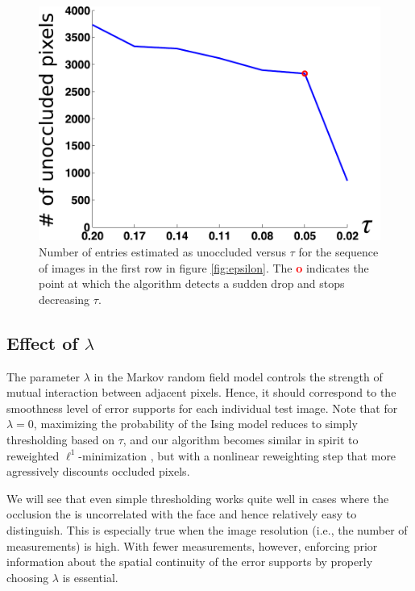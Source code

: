 \begin{figure}
\centering
\includegraphics[scale=0.6,clip=true]{figures_iccv/n_of_goodentry.pdf}\vspace{2mm}
\caption{Number of entries estimated as unoccluded versus
$\tau$ for the sequence of images in the first row in figure \ref{fig:epsilon}. The {\bf \textcolor{red} o} indicates the
point at which the algorithm detects a sudden drop and stops
decreasing $\tau$.} \label{fig:n_goodentry} \vspace{0mm}
\end{figure}

\subsection{Effect of $\lambda$}

The parameter $\lambda$ in the Markov random field model controls
the strength of mutual interaction between adjacent pixels. Hence, it
should correspond to the smoothness level of error supports for
each individual test image. Note that for $\lambda=0$, maximizing
the probability of the Ising model reduces to simply thresholding
based on $\tau$, and our algorithm becomes similar in spirit to
reweighted $\ell^1$-minimization \cite{Candes2008-JFAA}, but
with a nonlinear reweighting step that more agressively discounts occluded pixels.

We will see that even simple thresholding works
quite well in cases where the occlusion the is uncorrelated with the face and
hence relatively easy to distinguish. This is especially true when the
image resolution (i.e., the number of measurements) is high.
With fewer measurements, however, enforcing prior
information about the spatial continuity of the error supports by
properly choosing $\lambda$ is essential.\vspace{0mm}



